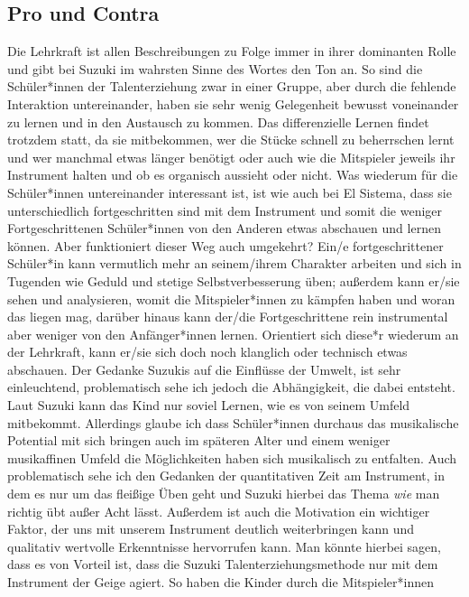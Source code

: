 \subsection{Pro und Contra}

Die Lehrkraft ist allen Beschreibungen zu Folge immer in ihrer dominanten Rolle
und gibt bei Suzuki im wahrsten Sinne des Wortes den Ton an. So sind die
Schüler*innen der Talenterziehung zwar in einer Gruppe, aber durch die fehlende
Interaktion untereinander, haben sie sehr wenig Gelegenheit bewusst voneinander
zu lernen und in den Austausch zu kommen. Das differenzielle Lernen findet
trotzdem statt, da sie mitbekommen, wer die Stücke schnell zu beherrschen lernt
und wer manchmal etwas länger benötigt oder auch wie die Mitspieler jeweils ihr
Instrument halten und ob es organisch aussieht oder nicht. Was wiederum für die
Schüler*innen untereinander interessant ist, ist wie auch bei El Sistema, dass
sie unterschiedlich fortgeschritten sind mit dem Instrument und somit die
weniger Fortgeschrittenen Schüler*innen von den Anderen etwas abschauen und
lernen können. Aber funktioniert dieser Weg auch umgekehrt? Ein/e
fortgeschrittener Schüler*in kann vermutlich mehr an seinem/ihrem Charakter
arbeiten und sich in Tugenden wie Geduld und stetige Selbstverbesserung üben;
außerdem kann er/sie sehen und analysieren, womit die Mitspieler*innen zu
kämpfen haben und woran das liegen mag, darüber hinaus kann der/die
Fortgeschrittene rein instrumental aber weniger von den Anfänger*innen lernen.
Orientiert sich diese*r wiederum an der Lehrkraft, kann er/sie sich doch noch
klanglich oder technisch etwas abschauen. Der Gedanke Suzukis auf die Einflüsse
der Umwelt, ist sehr einleuchtend, problematisch sehe ich jedoch die
Abhängigkeit, die dabei entsteht. Laut Suzuki kann das Kind nur soviel Lernen,
wie es von seinem Umfeld mitbekommt. Allerdings glaube ich dass Schüler*innen
durchaus das musikalische Potential mit sich bringen auch im späteren Alter und
einem weniger musikaffinen Umfeld die Möglichkeiten haben sich musikalisch zu
entfalten. Auch problematisch sehe ich den Gedanken der quantitativen Zeit am
Instrument, in dem es nur um das fleißige Üben geht und Suzuki hierbei das Thema
\emph{wie} man richtig übt außer Acht lässt. Außerdem ist auch die Motivation
ein wichtiger Faktor, der uns mit unserem Instrument deutlich weiterbringen kann
und qualitativ wertvolle Erkenntnisse hervorrufen kann. Man könnte hierbei
sagen, dass es von Vorteil ist, dass die Suzuki Talenterziehungsmethode nur mit
dem Instrument der Geige agiert. So haben die Kinder durch die Mitspieler*innen
